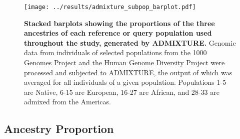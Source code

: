 \documentclass[11pt]{article}
\begin{document}








\begin{figure}[htb!]%
    \centering
    \texttt{[image: 
        ../results/admixture\_subpop\_barplot.pdf]} 
    \vspace{-0.2cm}
    \caption{\textbf{
        Stacked barplots showing the proportions of the three ancestries of each reference or query population used throughout the study, generated by ADMIXTURE.
    }
        Genomic data from individuals of selected populations from the 1000 Genomes Project and the Human Genome Diversity Project were processed and subjected to ADMIXTURE, the output of which was averaged for all individuals of a given population. Populations 1-5 are Native, 6-15 are European, 16-27 are African, and 28-33 are admixed from the Americas.
    }
\end{figure}

\subsection{Ancestry Proportion}
\end{document}
